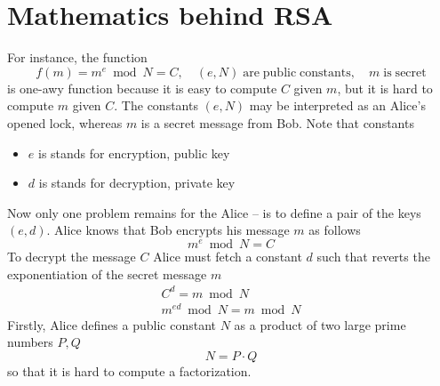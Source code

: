 \documentclass[12pt,letterpaper,oneside,reqno]{amsart}
\begin{document}
    \section{Mathematics behind RSA}\label{sec:mathematics-behind-rsa}
    For instance, the function
    \begin{equation*}
        f(m) = m^e \bmod N = C, \quad (e, N) \mathrm{\; are \; public \; constants}, \quad m \; \mathrm{is \; secret}
    \end{equation*}
    is one-awy function because it is easy to compute $C$ given $m$, but it is hard to compute $m$ given $C$.
    The constants $(e, N)$ may be interpreted as an Alice's opened lock, whereas $m$ is a secret message from Bob.
    Note that constants
    \begin{itemize}
        \item $e$ is stands for encryption, public key
        \item $d$ is stands for decryption, private key
    \end{itemize}
    Now only one problem remains for the Alice -- is to define a pair of the keys $(e, d)$.
    Alice knows that Bob encrypts his message $m$ as follows
    \[
        m^e \bmod N = C
    \]
    To decrypt the message $C$ Alice must fetch a constant $d$ such that reverts the exponentiation of the
    secret message $m$
    \begin{eqnarray*}
        C^d = m \bmod N \\
        m^{ed} \bmod N = m \bmod N
    \end{eqnarray*}
    Firstly, Alice defines a public constant $N$ as a product of two large prime numbers $P, Q$
    \[
        N = P \cdot Q
    \]
    so that it is hard to compute a factorization.
\end{document}
